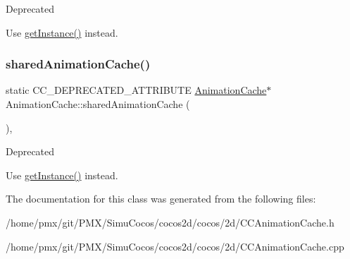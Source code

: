 \begin{DoxyRefDesc}{Deprecated}
\item[\hyperlink{deprecated__deprecated000019}{Deprecated}]Use \hyperlink{classAnimationCache_af742b69910d1739949ac532cfc3ea30c}{get\+Instance()} instead. \end{DoxyRefDesc}
\mbox{\label{classAnimationCache_ad8f32209ad141f9244ec14ba960579f0}} 
\subsubsection{\texorpdfstring{shared\+Animation\+Cache()}{sharedAnimationCache()}\hspace{0.1cm}{\footnotesize\ttfamily [2/2]}}
{\footnotesize\ttfamily static C\+C\+\_\+\+D\+E\+P\+R\+E\+C\+A\+T\+E\+D\+\_\+\+A\+T\+T\+R\+I\+B\+U\+TE \hyperlink{classAnimationCache}{Animation\+Cache}$\ast$ Animation\+Cache\+::shared\+Animation\+Cache (\begin{DoxyParamCaption}{ }\end{DoxyParamCaption})\hspace{0.3cm}{\ttfamily [inline]}, {\ttfamily [static]}}

\begin{DoxyRefDesc}{Deprecated}
\item[\hyperlink{deprecated__deprecated000249}{Deprecated}]Use \hyperlink{classAnimationCache_af742b69910d1739949ac532cfc3ea30c}{get\+Instance()} instead. \end{DoxyRefDesc}


The documentation for this class was generated from the following files\+:\begin{DoxyCompactItemize}
\item 
/home/pmx/git/\+P\+M\+X/\+Simu\+Cocos/cocos2d/cocos/2d/C\+C\+Animation\+Cache.\+h\item 
/home/pmx/git/\+P\+M\+X/\+Simu\+Cocos/cocos2d/cocos/2d/C\+C\+Animation\+Cache.\+cpp\end{DoxyCompactItemize}
